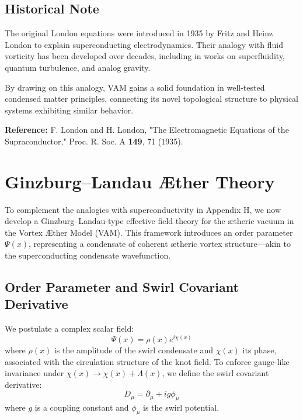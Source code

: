         \subsection{Historical Note}
        The original London equations were introduced in 1935 by Fritz and Heinz London to explain superconducting electrodynamics. Their analogy with fluid vorticity has been developed over decades, including in works on superfluidity, quantum turbulence, and analog gravity.

        By drawing on this analogy, VAM gains a solid foundation in well-tested condensed matter principles, connecting its novel topological structure to physical systems exhibiting similar behavior.

        \bigskip

        \noindent \textbf{Reference:} F. London and H. London, "The Electromagnetic Equations of the Supraconductor," Proc. R. Soc. A \textbf{149}, 71 (1935).

\section{Ginzburg--Landau Æther Theory}
        To complement the analogies with superconductivity in Appendix H, we now develop a Ginzburg--Landau-type effective field theory for the ætheric vacuum in the Vortex Æther Model (VAM). This framework introduces an order parameter $\Psi(x)$, representing a condensate of coherent ætheric vortex structure---akin to the superconducting condensate wavefunction.

        \subsection{Order Parameter and Swirl Covariant Derivative}
        We postulate a complex scalar field:
        \begin{equation}
            \Psi(x) = \rho(x) e^{i\chi(x)}
        \end{equation}
        where $\rho(x)$ is the amplitude of the swirl condensate and $\chi(x)$ its phase, associated with the circulation structure of the knot field. To enforce gauge-like invariance under $\chi(x) \rightarrow \chi(x) + \Lambda(x)$, we define the swirl covariant derivative:
        \begin{equation}
            D_\mu = \partial_\mu + i g \phi_\mu
        \end{equation}
        where $g$ is a coupling constant and $\phi_\mu$ is the swirl potential.

